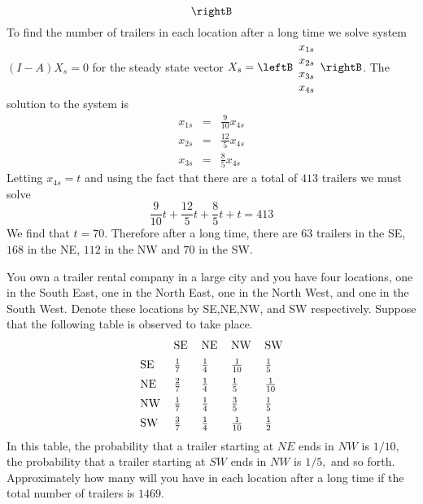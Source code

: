 \begin{enumialphparenastyle}
\begin{ex}
\begin{sol}
\[\begin{array}{rrrr}
\end{array}
\rightB
\]
To find the number of trailers in each location after a long time we solve system $(I - A)X_s = 0$ for the steady state vector $X_s = \leftB \begin{array}{c}
x_{1s} \\
x_{2s} \\
x_{3s} \\
x_{4s} 
\end{array}
\rightB$. 
The solution to the system is 
\begin{eqnarray*}
x_{1s} &=& \frac{9}{10} x_{4s} \\
x_{2s} &=& \frac{12}{5} x_{4s} \\
x_{3s} &=& \frac{8}{5} x_{4s} 
\end{eqnarray*}
Letting $x_{4s} = t$ and using the fact that there are a total of $413$ trailers we must solve
\[
\frac{9}{10} t + \frac{12}{5} t + \frac{8}{5}t  + t = 413
\]
We find that $t=70$. Therefore after a long time, there are $63$ trailers in the SE, $168$ in the NE, $112$ in the NW and $70$ in the SW.  
\end{sol}
\end{ex}

\begin{ex} You own a trailer rental company in a large city and you have four
locations, one in the South East, one in the North East, one in the North
West, and one in the South West. Denote these locations by SE,NE,NW, and SW
respectively. Suppose that the following table is observed to take place.
\begin{equation*}
\begin{tabular}{lllll}
& SE & NE & NW & SW \\[0.5em]
SE & $\frac{1}{7}$ & $\frac{1}{4}$ & $\frac{1}{10}$ & $\frac{1}{5}$ \\[0.5em]
NE & $\frac{2}{7}$ & $\frac{1}{4}$ & $\frac{1}{5}$ & $\frac{1}{10}$ \\[0.5em]
NW & $\frac{1}{7}$ & $\frac{1}{4}$ & $\frac{3}{5}$ & $\frac{1}{5}$ \\[0.5em]
SW & $\frac{3}{7}$ & $\frac{1}{4}$ & $\frac{1}{10}$ & $\frac{1}{2}$ \\
\end{tabular}
\end{equation*}
In this table, the probability that a trailer starting at $NE$ ends in $NW$
is $1/10,$ the probability that a trailer starting at $SW$ ends in $NW$ is 
$1/5,$ and so forth. Approximately how many will you have in each location
after a long time if the total number of trailers is $1469.$
\end{ex}


\end{enumialphparenastyle}
